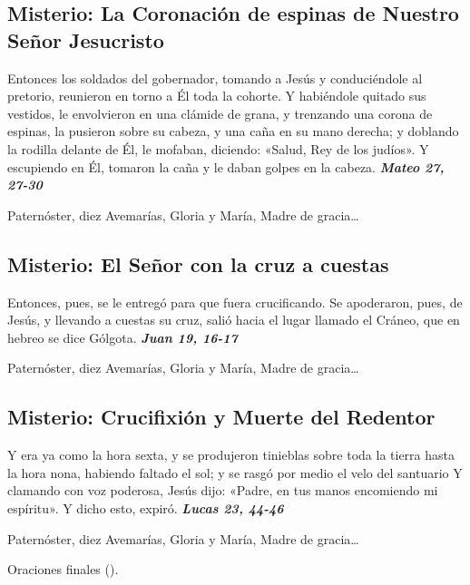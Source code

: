\documentclass[./rosary.tex]{subfiles}
\newcounter{sorrowful-counter}
\begin{document}
\subsection*{ Misterio: La Coronación de espinas de Nuestro Señor Jesucristo}

Entonces los soldados del gobernador, tomando a Jesús y conduciéndole al pretorio,
reunieron en torno a Él toda la cohorte. Y habiéndole quitado sus vestidos, le envolvieron en una clámide de grana,
y trenzando una corona de espinas, la pusieron sobre su cabeza, y una caña en su mano derecha;
y doblando la rodilla delante de Él, le mofaban, diciendo: «Salud, Rey de los judíos».
Y escupiendo en Él, tomaron la caña y le daban golpes en la cabeza. 
\textbf{\emph{Mateo 27, 27-30}}

\begin{center}
      Paternóster, diez Avemarías, Gloria y María, Madre de gracia{\ldots}
\end{center}

\bigskip

\subsection*{ Misterio: El Señor con la cruz a cuestas}

Entonces, pues, se le entregó para que fuera crucificando. Se apoderaron, pues, de Jesús,
y llevando a cuestas su cruz, salió hacia el lugar llamado el Cráneo, que en hebreo se dice Gólgota. 
\textbf{\emph{Juan 19, 16-17}}

\begin{center}
      Paternóster, diez Avemarías, Gloria y María, Madre de gracia{\ldots}
\end{center}

\bigskip

\subsection*{ Misterio: Crucifixión y Muerte del Redentor}

Y era ya como la hora sexta, y se produjeron tinieblas sobre toda la tierra hasta la hora nona,
habiendo faltado el sol; y se rasgó por medio el velo del santuario Y clamando con voz poderosa,
Jesús dijo: «Padre, en tus manos encomiendo mi espíritu». Y dicho esto, expiró. 
\textbf{\emph{Lucas 23, 44-46}}

\begin{center}
      Paternóster, diez Avemarías, Gloria y María, Madre de gracia{\ldots}
      
      Oraciones finales ().
\end{center}
\end{document}
